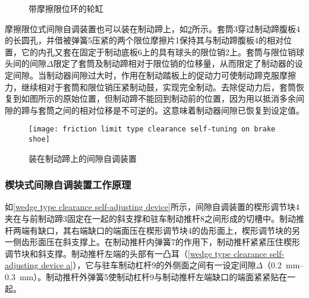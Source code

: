 \documentclass[UTF8]{ctexart}
\numberwithin{figure}{section}
\numberwithin{table}{section}
\begin{document}
\begin{figure}[htbp]
	\centering
	\begin{minipage}[b]{\textwidth}
		\centering
		\caption{带摩擦限位环的轮缸}
		\label{friction limit type clearance self-tuning}
	\end{minipage}
\end{figure}

摩擦限位式间隙自调装置也可以装在制动蹄上，如\cref{friction limit type clearance self-tuning on brake shoe}所示。套筒3穿过制动蹄腹板4的长圆孔，并借被弹簧5压紧的两个限位摩擦片1保持其与制动蹄腹板4的相对位置，它的内孔又套在固定于制动底板6上的具有球头的限位销2上。套筒与限位销球头间的间隙$\Delta$限定了套筒及制动蹄相对于限位销的位移量，从而限定了制动器的设定间隙。当制动器间隙过大时，作用在制动踏板上的促动力可使制动蹄克服摩擦力，继续相对于套筒和限位销压紧制动鼓，实现完全制动。去除促动力后，套筒恢复到如图所示的原始位置，但制动蹄不能回到制动前的位置，因为用以抵消多余间隙的蹄与套筒之间的相对位移是不可逆的。这意味着制动器间隙已恢复到设定值。

\begin{figure}[htbp]
	\centering
	\begin{minipage}[b]{0.5\textwidth}
		\centering
		\texttt{[image: friction limit type clearance self-tuning on brake shoe]}
		\caption{装在制动蹄上的间隙自调装置}
		\label{friction limit type clearance self-tuning on brake shoe}
	\end{minipage}
\end{figure}

\subsubsection{楔块式间隙自调装置工作原理}

如\cref{wedge type clearance self-adjusting device}所示，间隙自调装置的楔形调节块4夹在与前制动蹄3固定在一起的斜支撑和驻车制动推杆8之间形成的切槽中。制动推杆两端有缺口，其右端缺口的端面压在楔形调节块4的齿形面上，楔形调节块的另一侧齿形面压在斜支撑上。在制动推杆内弹簧7的作用下，制动推杆紧紧压住楔形调节块和斜支撑。制动推杆左端的头部有一凸耳（\cref{wedge type clearance self-adjusting device a}），它与驻车制动杠杆9的外侧面之间有一设定间隙$\Delta$（\qtyrange[range-phrase = $\,\sim\,$, range-units = single]{0.2}{0.3}{\mm}）。制动推杆外弹簧5使制动杠杆9与制动推杆左端缺口的端面紧紧贴在一起。
\end{document}

